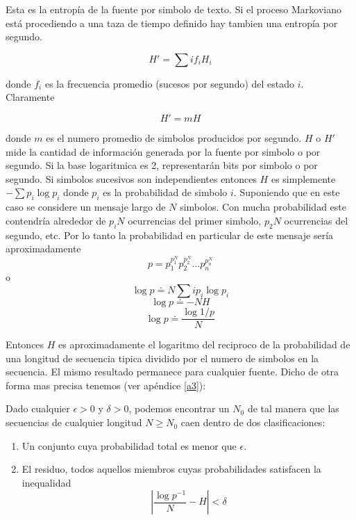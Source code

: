 Esta es la entrop\'{i}a de la fuente por simbolo de texto. Si el proceso
Markoviano est\'{a} procediendo a una taza de tiempo definido hay tambien
una entrop\'{i}a por segundo.

\begin{equation}
H' = \sum{i}{} f_{i}H_{i}
\end{equation}

donde $f_{i}$ es la frecuencia promedio (sucesos por segundo) del estado $i$. Claramente

\begin{equation}
H' = mH
\end{equation}

donde $m$ es el numero promedio de simbolos producidos por
segundo. $H$ o $H'$ mide la cantidad de informaci\'{o}n generada por
la fuente por simbolo o por segundo. Si la base logaritmica es 2,
representar\'{a}n bits por simbolo o por segundo.  Si simbolos
sucesivos son independientes entonces $H$ es simplemente $-\sum p_{i}
\log p_{i}$ donde $p_{i}$ es la probabilidad de simbolo
$i$. Suponiendo que en este caso se considere un mensaje largo de $N$
simbolos. Con mucha probabilidad este contendr\'{i}a alrededor de
$p_{i}N$ ocurrencias del primer simbolo, $p_{2}N$ ocurrencias del
segundo, etc. Por lo tanto la probabilidad en particular de este
mensaje ser\'{i}a aproximadamente
\begin{equation}
p = p_{1}^{ p_{1}^{N}} p_{2}^{ p_{2}^{N}} \ldots p_{n}^{ p_{n}^{N}}
\end{equation}
o
\begin{equation}
\log p \doteq N \sum{i}{} p_{i} \log p_{i}
\end{equation}
\begin{equation}
\log p \doteq -NH
\end{equation}
\begin{equation}
\log p \doteq \frac{\log 1/p}{N}
\end{equation}

Entonces $H$ es aproximadamente el logaritmo del reciproco de la
probabilidad de una longitud de secuencia tipica dividido por el
numero de simbolos en la secuencia. El mismo resultado permanece para
cualquier fuente. Dicho de otra forma mas precisa tenemos (ver
ap\'{e}ndice \ref{a3}): 

\begin{theorem}
Dado cualquier $\epsilon > 0$ y $\delta > 0$, podemos encontrar un
$N_{0}$ de tal manera que las secuencias de cualquier longitud $N \geq
N_{0}$ caen dentro de dos clasificaciones:
\begin{enumerate}
\item Un conjunto cuya probabilidad total es menor que $\epsilon$.
\item El residuo, todos aquellos miembros cuyas probabilidades satisfacen la inequalidad
\begin{equation}
|\frac{\log p^{-1}}{N} - H| < \delta
\end{equation}
\end{enumerate}
\end{theorem}

